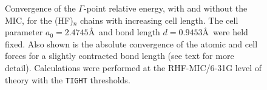 \documentclass[prl,twocolumn,showpacs,twocolumngrid,superbib]{revtex4}
\begin{document}
\begin{figure}[h]
  \caption{Convergence of the $\Gamma$-point relative energy, with and without the MIC,
    for the (HF)$_n$ chains with increasing cell length. The cell parameter 
    $a_0=2.4745$\AA~and bond length $d=0.9453$\AA~were held fixed. 
    Also shown is the absolute convergence of the atomic and cell forces for a slightly contracted 
    bond length (see text for more detail).
    Calculations were performed at the RHF-MIC/6-31G level of theory with 
    the {\tt TIGHT} thresholds.}\label{Fig:CnvgEnergy}
\end{figure}
\end{document}
